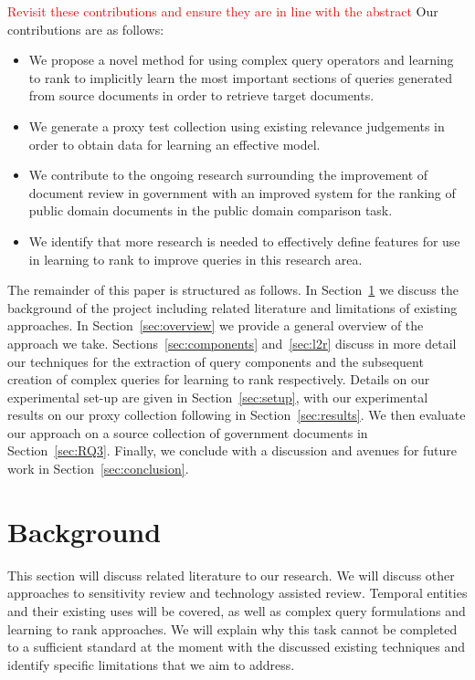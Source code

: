 \documentclass{mpaper}
\newcommand{\remove}[1]{\textcolor{red}{#1}}
\begin{document}
\remove{Revisit these contributions and ensure they are in line with the abstract}
Our contributions are as follows:
\begin{itemize}
\item We propose a novel method for using complex query operators and learning to rank to implicitly learn the most important sections of queries generated from source documents in order to retrieve target documents.
\item We generate a proxy test collection using existing relevance judgements in order to obtain data for learning an effective model.
\item We contribute to the ongoing research surrounding the improvement of document review in government with an improved system for the ranking of public domain documents in the public domain comparison task.
\item We identify that more research is needed to effectively define features for use in learning to rank to improve queries in this research area.
\end{itemize}

The remainder of this paper is structured as follows.
In Section~\ref{sec:background} we discuss the background of the project including related literature and limitations of existing approaches.
In Section~\ref{sec:overview} we provide a general overview of the approach we take.
Sections~\ref{sec:components} and~\ref{sec:l2r} discuss in more detail our techniques for the extraction of query components and the subsequent creation of complex queries for learning to rank respectively.
Details on our experimental set-up are given in Section~\ref{sec:setup}, with our experimental results on our proxy collection following in Section~\ref{sec:results}. We then evaluate our approach on a source collection of government documents in Section~\ref{sec:RQ3}.
Finally, we conclude with a discussion and avenues for future work in Section~\ref{sec:conclusion}.

\section{Background} \label{sec:background}
This section will discuss related literature to our research. We will discuss other approaches to sensitivity review and technology assisted review. Temporal entities and their existing uses will be covered, as well as complex query formulations and learning to rank approaches. We will explain why this task cannot be completed to a sufficient standard at the moment with the discussed existing techniques and identify specific limitations that we aim to address.
\end{document}

